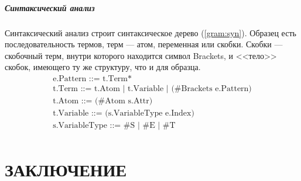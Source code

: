 \documentclass[12pt]{article}
\begin{document}
\subsubsection[Синтаксический анализ]{\large Синтаксический анализ}
\hspace{\parindent} Синтаксический анализ строит синтаксическое дерево (\ref{gram:syn}). Образец есть последовательность термов, терм --- атом, переменная или скобки. Скобки --- скобочный терм, внутри которого находится символ
Brackets, и <<тело>> скобок, имеющего ту же структуру, что и для образца.
\begin{equation}\label{gram:syn}
\begin{array}{l}
\textrm{e.Pattern ::= t.Term*} \\
\textrm{t.Term ::= t.Atom | t.Variable | (\#Brackets e.Pattern)} \\
\textrm{t.Atom ::= (\#Atom s.Attr)} \\
\textrm{t.Variable ::= (s.VariableType e.Index)} \\
\textrm{s.VariableType ::= \#S | \#E | \#T} \\
\end{array}
\end{equation}

\indent 

\clearpage
\newpage

\part*{\large \centering ЗАКЛЮЧЕНИЕ}
\hspace{\parindent}

\clearpage
\newpage
\begin{flushleft}
\end{flushleft}
\end{document}
